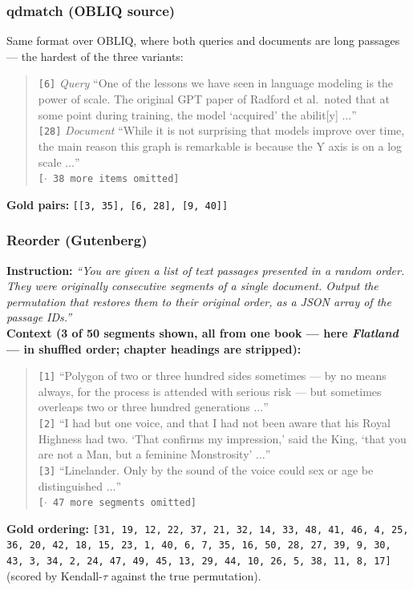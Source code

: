 \subsubsection{qdmatch (OBLIQ source)}

Same format over OBLIQ, where both queries and documents are long passages --- the hardest of the
three variants:
\begin{quote}\small
\texttt{[6]} \emph{Query} ``One of the lessons we have seen in language modeling is the power of
scale. The original GPT paper of Radford et al.\ noted that at some point during training, the model
`acquired' the abilit[y] $\dots$''\\
\texttt{[28]} \emph{Document} ``While it is not surprising that models improve over time, the main
reason this graph is remarkable is because the Y axis is on a log scale $\dots$''\\
\texttt{[$\cdot$ 38 more items omitted]}
\end{quote}
\textbf{Gold pairs:} \texttt{[[3, 35], [6, 28], [9, 40]]}

\subsubsection{Reorder (Gutenberg)}

\textbf{Instruction:} \emph{``You are given a list of text passages presented in a random order. They
were originally consecutive segments of a single document. Output the permutation that restores them
to their original order, as a JSON array of the passage IDs.''}\\
\textbf{Context (3 of 50 segments shown, all from one book --- here \emph{Flatland} --- in shuffled
order; chapter headings are stripped):}
\begin{quote}\small
\texttt{[1]} ``Polygon of two or three hundred sides sometimes --- by no means always, for the process
is attended with serious risk --- but sometimes overleaps two or three hundred generations $\dots$''\\
\texttt{[2]} ``I had but one voice, and that I had not been aware that his Royal Highness had two.
`That confirms my impression,' said the King, `that you are not a Man, but a feminine Monstrosity'
$\dots$''\\
\texttt{[3]} ``Linelander. Only by the sound of the voice could sex or age be distinguished
$\dots$''\\
\texttt{[$\cdot$ 47 more segments omitted]}
\end{quote}
\textbf{Gold ordering:} \texttt{[31, 19, 12, 22, 37, 21, 32, 14, 33, 48, 41, 46, 4, 25, 36, 20, 42,
18, 15, 23, 1, 40, 6, 7, 35, 16, 50, 28, 27, 39, 9, 30, 43, 3, 34, 2, 24, 47, 49, 45, 13, 29, 44, 10,
26, 5, 38, 11, 8, 17]}\quad(scored by Kendall-$\tau$ against the true permutation).


